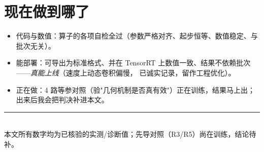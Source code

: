 \documentclass[UTF8,11pt,a4paper]{ctexart}
\newcommand{\good}[1]{\textcolor{good}{#1}}
\begin{document}
\section{现在做到哪了}
\begin{itemize}[leftmargin=1.4em,itemsep=1pt]
\item \good{代码与数值}：算子的各项自检全过（参数严格对齐、起步恒等、数值稳定、与批次无关）。
\item \good{能部署}：可导出为标准格式、并在 TensorRT 上数值一致、结果不依赖批次——\emph{真能上线}（速度上动态卷积偏慢，
已诚实记录，留作工程优化）。
\item \textcolor{orange!80!black}{正在做}：4 路等参对照（验"几何机制是否真有效"）正在训练，结果马上出；出来后我会把判决补进本文。
\end{itemize}

\vspace{2pt}
\noindent\rule{\linewidth}{0.4pt}\\[2pt]
{\footnotesize 本文所有数字均为已核验的实测/诊断值；先导对照（R3/R5）尚在训练，结论待补。}
\end{document}
